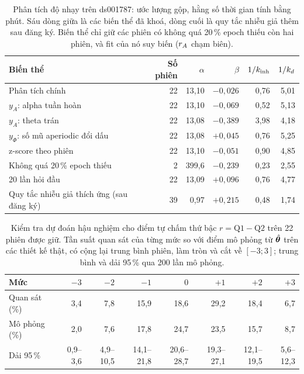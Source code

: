 \begin{table}[H]
\centering\footnotesize
\caption{Phân tích độ nhạy trên ds001787: ước lượng gộp, hằng số thời gian tính bằng phút. Sáu dòng giữa là các biến thể đã khoá, dòng cuối là quy tắc nhiễu giả thêm sau đăng ký. Biến thể chỉ giữ các phiên có không quá 20\,\% epoch thiếu còn hai phiên, và fit của nó suy biến ($r_{A}$ chạm biên).}
\label{tab:real-sens}
\setlength{\tabcolsep}{4pt}
\begin{tabular}{lrrrrr}
\toprule
Biến thể & Số phiên & $\alpha$ & $\beta$ & $1/k_{\mathrm{inh}}$ & $1/k_{d}$ \\
\midrule
Phân tích chính                              & 22 & 13,10 & $-0{,}026$ & 0,76 & 5,01 \\
\midrule
$y_A$: alpha tuần hoàn                       & 22 & 13,10 & $-0{,}069$ & 0,52 & 5,13 \\
$y_A$: theta trán                            & 22 & 13,08 & $-0{,}389$ & 3,98 & 4,18 \\
$y_\Phi$: số mũ aperiodic đổi dấu            & 22 & 13,08 & $+0{,}045$ & 0,76 & 5,25 \\
z-score theo phiên                           & 22 & 13,10 & $-0{,}051$ & 0,90 & 4,85 \\
Không quá 20\,\% epoch thiếu                 &  2 & 399,6 & $-0{,}239$ & 0,23 & 2,55 \\
20 lần hỏi đầu                               & 22 & 13,09 & $+0{,}096$ & 0,76 & 4,77 \\
\midrule
Quy tắc nhiễu giả thích ứng (sau đăng ký)    & 39 & 0,97 & $+0{,}215$ & 0,48 & 1,74 \\
\bottomrule
\end{tabular}
\end{table}

\begin{table}[H]
\centering\footnotesize
\caption{Kiểm tra dự đoán hậu nghiệm cho điểm tự chấm thứ bậc $r=\mathrm{Q1}-\mathrm{Q2}$ trên 22 phiên được giữ. Tần suất quan sát của từng mức so với điểm mô phỏng từ $\hat{\boldsymbol{\theta}}$ trên các thiết kế thật, có cộng lại trung bình phiên, làm tròn và cắt về $[-3;3]$; trung bình và dải 95\,\% qua 200 lần mô phỏng.}
\label{tab:real-ppc}
\setlength{\tabcolsep}{4.5pt}
\begin{tabular}{lrrrrrrr}
\toprule
Mức & $-3$ & $-2$ & $-1$ & $0$ & $+1$ & $+2$ & $+3$ \\
\midrule
Quan sát (\%)   & 3,4 & 7,8 & 15,9 & 18,6 & 29,2 & 18,4 & 6,7 \\
Mô phỏng (\%)   & 2,0 & 7,6 & 17,8 & 24,7 & 23,5 & 15,7 & 8,7 \\
Dải 95\,\%      & 0,9--3,6 & 4,9--10,5 & 14,1--21,8 & 20,6--28,7 & 19,3--27,1 & 12,1--19,5 & 5,6--12,3 \\
\bottomrule
\end{tabular}
\end{table}

